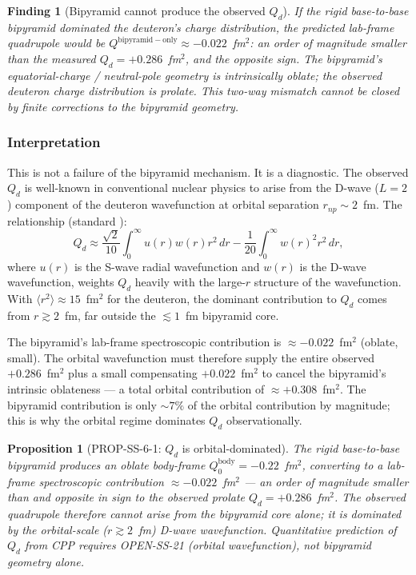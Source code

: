 \documentclass[11pt,letterpaper]{article}
\newtheorem{proposition}[theorem]{Proposition}
\newtheorem{finding}[theorem]{Finding}
\newcommand{\Qd}{Q_{d}}
\begin{document}
\begin{finding}[Bipyramid cannot produce the observed $\Qd$]
\label{find:Qd_sign}
If the rigid base-to-base bipyramid dominated the deuteron's charge distribution, the predicted lab-frame quadrupole would be $Q^{\mathrm{bipyramid-only}} \approx -0.022$~fm$^2$: an order of magnitude smaller than the measured $\Qd = +0.286$~fm$^2$, \emph{and} the opposite sign. The bipyramid's equatorial-charge / neutral-pole geometry is intrinsically oblate; the observed deuteron charge distribution is prolate. This two-way mismatch cannot be closed by finite corrections to the bipyramid geometry.
\end{finding}

\subsubsection{Interpretation}

This is not a failure of the bipyramid mechanism. It is a diagnostic. The observed $\Qd$ is well-known in conventional nuclear physics to arise from the D-wave ($L = 2$) component of the deuteron wavefunction at orbital separation $r_{np} \sim 2$~fm. The relationship (standard \cite{krane_nuclear}):
\[
\Qd \approx \frac{\sqrt 2}{10} \int_0^\infty u(r) w(r) r^2 \, dr - \frac{1}{20}\int_0^\infty w(r)^2 r^2 \, dr,
\]
where $u(r)$ is the S-wave radial wavefunction and $w(r)$ is the D-wave wavefunction, weights $\Qd$ heavily with the large-$r$ structure of the wavefunction. With $\langle r^2 \rangle \approx 15$~fm$^2$ for the deuteron, the dominant contribution to $\Qd$ comes from $r \gtrsim 2$~fm, far outside the ${\lesssim}1$~fm bipyramid core.

The bipyramid's lab-frame spectroscopic contribution is $\approx -0.022$~fm$^2$ (oblate, small). The orbital wavefunction must therefore supply the entire observed $+0.286$~fm$^2$ plus a small compensating $+0.022$~fm$^2$ to cancel the bipyramid's intrinsic oblateness --- a total orbital contribution of $\approx +0.308$~fm$^2$. The bipyramid contribution is only ${\sim}7\%$ of the orbital contribution by magnitude; this is why the orbital regime dominates $\Qd$ observationally.

\begin{proposition}[PROP-SS-6-1: $\Qd$ is orbital-dominated]
\label{prop:Qd_orbital}
The rigid base-to-base bipyramid produces an oblate body-frame $Q_0^{\mathrm{body}} = -0.22$~fm$^2$, converting to a lab-frame spectroscopic contribution $\approx -0.022$~fm$^2$ --- an order of magnitude smaller than and opposite in sign to the observed prolate $\Qd = +0.286$~fm$^2$. The observed quadrupole therefore cannot arise from the bipyramid core alone; it is dominated by the orbital-scale ($r \gtrsim 2$~fm) D-wave wavefunction. Quantitative prediction of $\Qd$ from CPP requires OPEN-SS-21 (orbital wavefunction), not bipyramid geometry alone.
\end{proposition}
\end{document}
